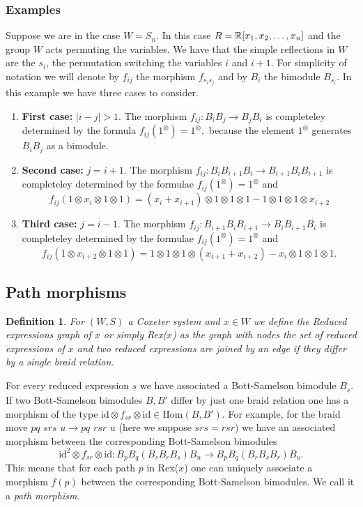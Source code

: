 \documentclass[12pt]{wart}
\newtheorem{defi}{Definition}
\theoremstyle{remark}
\begin{document}
\subsubsection{Examples} Suppose we are in the case $W=S_n$. In this case $R=\mathbb R[x_1,x_2, \ldots, x_n]$ and the group $W$ acts permuting the variables. We have that the simple reflections in $W$ are the $s_i$, the permutation switching the variables $i$ and $i+1$.  For simplicity of notation we will denote by $f_{ij}$ the morphism $f_{s_is_j}$ and by $B_i$ the bimodule $B_{s_i}$.
In this example we have three cases to consider. 
\begin{enumerate}
\item \textbf{First case:} $\vert i-j \vert>1$. The morphism $f_{ij}:B_iB_j\rightarrow B_jB_i$ is completeley determined by the formula $f_{ij}(1^{\otimes})=1^{\otimes},$ because the element $1^{\otimes}$ generates $B_iB_j$ as a bimodule. 
\item \textbf{Second case:} $j=i+1$. The morphism $f_{ij}:B_iB_{i+1}B_i\rightarrow B_{i+1}B_iB_{i+1}$ is completeley determined by the formulae $f_{ij}(1^{\otimes})=1^{\otimes}$ and $$f_{ij}(1\otimes x_i\otimes 1\otimes 1)=(x_i+x_{i+1})\otimes 1\otimes 1\otimes 1- 1\otimes 1\otimes 1\otimes x_{i+2}$$
\item \textbf{Third case:} $j=i-1$.  The morphism $f_{ij}:  B_{i+1}B_iB_{i+1}\rightarrow  B_iB_{i+1}B_i  $ is completeley determined by the formulae $f_{ij}(1^{\otimes})=1^{\otimes}$ and $$f_{ij}(1\otimes x_{i+2}\otimes 1\otimes 1)=1\otimes 1\otimes 1\otimes (x_{i+1}+x_{i+2})- x_i\otimes 1\otimes 1\otimes 1.$$
\end{enumerate}


\subsection{Path morphisms}\label{f} 



\begin{defi} For $(W,S)$ a Coxeter system and $x\in W$ we define the \emph{Reduced expressions graph of $x$} or simply \emph{Rex($x$)} as the graph with nodes the set of reduced expressions of $x$ and  two reduced expressions are joined by an edge if they differ by a single braid relation. 
\end{defi}

For every reduced expression $\underline{s}$ we have associated a Bott-Samelson bimodule $ B_{\underline{s}}.$ If two Bott-Samelson bimodules $B, B'$ differ  by just one braid relation one has a morphism of the type $\mathrm{id}\otimes f_{sr}\otimes \mathrm{id}\in \mathrm{Hom}(B,B')$. For example, for the braid move $pq\,\, srs\,\, u\rightarrow pq\,\, rsr\,\, u$ (here we suppose $srs=rsr$) we have an associated morphism between the corresponding Bott-Samelson bimodules  $$\mathrm{id^2}\otimes f_{sr}\otimes \mathrm{id} : B_pB_q (B_sB_rB_s) B_u\rightarrow B_pB_q(B_rB_sB_r) B_u.$$This means that for each  path $p$ in Rex($x$)  one can uniquely associate a morphism $f(p)$ between the corresponding Bott-Samelson bimodules. We call it  a \emph{path morphism.}
\end{document}
